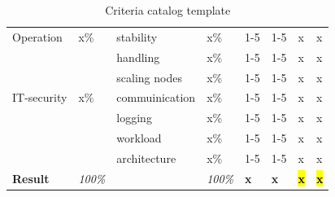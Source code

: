 \documentclass[MSC,Master,english]{twbook}%
\begin{document}
\begin{table}[ht]
\begin{center}
{\begin{tabular}{|l|l|l|l|l|l|l|l|}
            \hline
            Operation & x\% & stability & x\% & 1-5 & 1-5 & x & x \\
            & & handling & x\% & 1-5 & 1-5 & x & x \\
            & & scaling nodes & x\% & 1-5 & 1-5 & x & x \\
            \hline
            IT-security & x\% & commuinication & x\% & 1-5 & 1-5 & x & x \\
            & & logging & x\% & 1-5 & 1-5 & x & x  \\
            & & workload & x\% & 1-5 & 1-5 & x & x \\
            & & architecture & x\% & 1-5 & 1-5 & x & x \\
            \hline \hline
            \textbf{Result} & \textit{100\%} & & \textit{100\%} & \textbf{x} & \textbf{x} & \hl{\textbf{x}} & \hl{\textbf{x}} \\
            \hline
        \end{tabular}}
        \caption{Criteria catalog template}
        \label{tab:cctt}
    \end{center}
\end{table}
\end{document}
